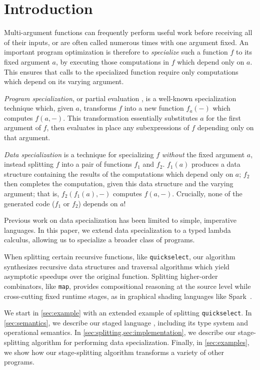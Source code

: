 \section{Introduction}

Multi-argument functions can frequently perform useful work before receiving all
of their inputs, or are often called numerous times with one argument fixed. An
important program optimization is therefore to \emph{specialize} such a function
$f$ to its fixed argument $a$, by executing those computations in $f$ which
depend only on $a$. This ensures that calls to the specialized function require
only computations which depend on its varying argument.

\emph{Program specialization}, or partial evaluation \cite{futamura71,jones96},
is a well-known specialization technique which, given $a$, transforms $f$ into a
new function $f_a(-)$ which computes $f(a,-)$. This transformation essentially
substitutes $a$ for the first argument of $f$, then evaluates in place any
subexpressions of $f$ depending only on that argument.

\emph{Data specialization} \cite{knoblock96,JS86-staging} 
is a technique for specializing $f$ \emph{without} the fixed argument $a$,
instead splitting $f$ into a pair of functions $f_1$ and $f_2$. $f_1(a)$
produces a data structure containing the results of the computations which
depend only on $a$; $f_2$ then completes the computation, given this data
structure and the varying argument; that is, $f_2(f_1(a),-)$ computes $f(a,-)$.
Crucially, none of the generated code ($f_1$ or $f_2$) depends on $a$!

Previous work on data specialization has been limited to simple, imperative
languages. In this paper, we extend data specialization to a typed lambda
calculus, allowing us to specialize a broader class of programs.

When splitting certain recursive functions, like \texttt{quickselect}, our
algorithm synthesizes recursive data structures and traversal algorithms which
yield asymptotic speedups over the original function. Splitting higher-order
combinators, like \texttt{map}, provides compositional reasoning at the source
level while cross-cutting fixed runtime stages, as in graphical shading
languages like Spark~\cite{Foley:2011}.

We start in \ref{sec:example} with an extended example of splitting
\texttt{quickselect}.
In \ref{sec:semantics}, we describe our staged language \lang, including its
type system and operational semantics.
In \ref{sec:splitting,sec:implementation}, we describe our stage-splitting
algorithm for performing data specialization.
Finally, in \ref{sec:examples}, we show how our stage-splitting algorithm
transforms a variety of other programs.
